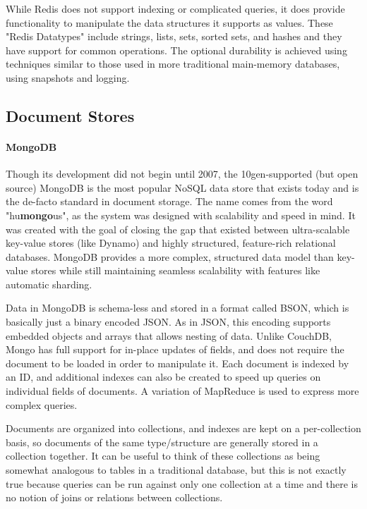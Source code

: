 \documentclass[11pt,a4paper]{report}
\begin{document}
While Redis does not support indexing or complicated queries, it does provide functionality to manipulate the data structures it supports as values. These "Redis Datatypes" include strings, lists, sets, sorted sets, and hashes and they have support for common operations. The optional durability is achieved using techniques similar to those used in more traditional main-memory databases, using snapshots and logging.\cite{paksulapersisting} 

\subsection{Document Stores}
\paragraph{MongoDB}
Though its development did not begin until 2007, the 10gen-supported (but open source) MongoDB is the most popular NoSQL data store that exists today and is the de-facto standard in document storage.\cite{metz2011mongo,dbranking} The name comes from the word "hu\textbf{mongo}us", as the system was designed with scalability and speed in mind.\cite{orend2010analysis} It was created with the goal of closing the gap that existed between ultra-scalable key-value stores (like Dynamo) and highly structured, feature-rich relational databases.\cite{strauch2011nosql} MongoDB provides a more complex, structured data model than key-value stores while still maintaining seamless scalability with features like automatic sharding.

Data in MongoDB is schema-less and stored in a format called BSON, which is basically just a binary encoded JSON. As in JSON, this encoding supports embedded objects and arrays that allows nesting of data. Unlike CouchDB, Mongo has full support for in-place updates of fields, and does not require the document to be loaded in order to manipulate it. Each document is indexed by an ID, and additional indexes can also be created to speed up queries on individual fields of documents. A variation of MapReduce is used to express more complex queries.\cite{orend2010analysis}

Documents are organized into collections, and indexes are kept on a per-collection basis, so documents of the same type/structure are generally stored in a collection together.\cite{strauch2011nosql} It can be useful to think of these collections as being somewhat analogous to tables in a traditional database, but this is not exactly true because queries can be run against only one collection at a time and there is no notion of joins or relations between collections.\cite{orend2010analysis}
\end{document}
